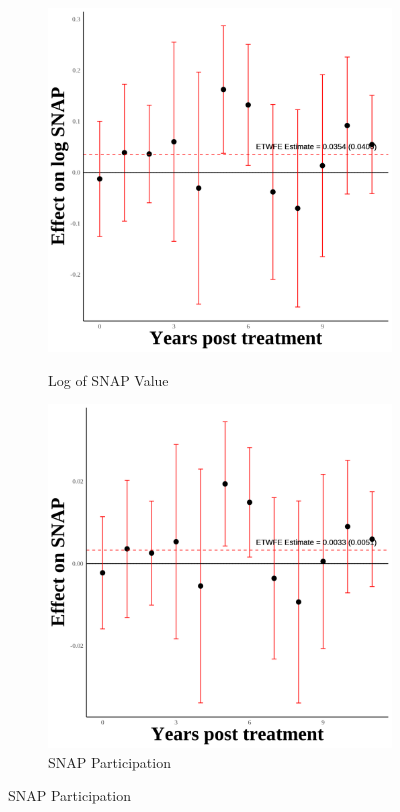 \documentclass[12pt,english]{article}
\begin{document}
\begin{figure}[H]
  \begin{subfigure}[b]{0.3\textwidth}
    \centering
    \caption{Log of SNAP Value}
    \includegraphics[width=\linewidth]{figures/plot84-ln_snap_event_study-third-four.png}
    \label{fig:ln-snap-third-four}
  \end{subfigure}
  \hfill
  \begin{subfigure}[b]{0.3\textwidth}
    \centering
    \caption{SNAP Participation}
    \includegraphics[width=\linewidth]{figures/plot85-snap_event_study-third-four.png}

\end{subfigure}
\end{figure}
\end{document}
